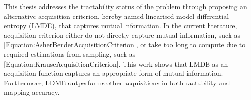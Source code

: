 			This thesis addresses the tractability status of the problem through proposing an alternative acquisition criterion, hereby named linearised model differential entropy (LMDE), that captures mutual information. In the current literature, acquisition criterion either do not directly capture mutual information, such as \eqref{Equation:AsherBenderAcquisitionCriterion}, or take too long to compute due to required estimations from sampling, such as \eqref{Equation:KrauseAcquisitionCriterion}. This work shows that LMDE as an acquisition function captures an appropriate form of mutual information. Furthermore, LDME outperforms other acquisitions in both ractability and mapping accuracy.		